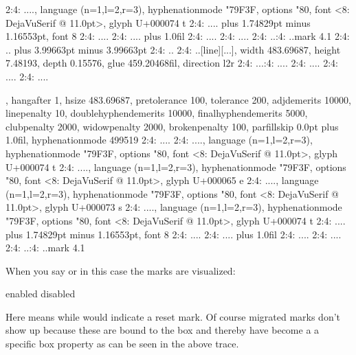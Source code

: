 2:4: ....\glyph[32768][...], language (n=1,l=2,r=3), hyphenationmode "79F3F, options "80, font <8: DejaVuSerif @ 11.0pt>, glyph U+000074 t
2:4: ....\glue[space][...] 3.49658pt plus 1.74829pt minus 1.16553pt, font 8
2:4: ....
2:4: ....\glue[parfill][...] 0.0pt plus 1.0fil
2:4: ....\glue[right][...] 0.0pt
2:4: ....
2:4: ..:4: ..{mark 4.1}
2:4: ..\glue[par][...] 11.98988pt plus 3.99663pt minus 3.99663pt
2:4: ..\glue[baseline][...] 8.34883pt
2:4: ..\hbox[line][...], width 483.69687, height 7.48193, depth 0.15576, glue 459.20468fil, direction l2r
2:4: ...:4: ....
2:4: ....\glue[left][...] 0.0pt
2:4: ....\glue[parfillleft][...] 0.0pt
2:4: ....\par[newgraf][...], hangafter 1, hsize 483.69687, pretolerance 100, tolerance 200, adjdemerits 10000, linepenalty 10, doublehyphendemerits 10000, finalhyphendemerits 5000, clubpenalty 2000, widowpenalty 2000, brokenpenalty 100, parfillskip 0.0pt plus 1.0fil, hyphenationmode 499519
2:4: ....\glue[indent][...] 0.0pt
2:4: ....\glyph[32768][...], language (n=1,l=2,r=3), hyphenationmode "79F3F, options "80, font <8: DejaVuSerif @ 11.0pt>, glyph U+000074 t
2:4: ....\glyph[32768][...], language (n=1,l=2,r=3), hyphenationmode "79F3F, options "80, font <8: DejaVuSerif @ 11.0pt>, glyph U+000065 e
2:4: ....\glyph[32768][...], language (n=1,l=2,r=3), hyphenationmode "79F3F, options "80, font <8: DejaVuSerif @ 11.0pt>, glyph U+000073 s
2:4: ....\glyph[32768][...], language (n=1,l=2,r=3), hyphenationmode "79F3F, options "80, font <8: DejaVuSerif @ 11.0pt>, glyph U+000074 t
2:4: ....\glue[space][...] 3.49658pt plus 1.74829pt minus 1.16553pt, font 8
2:4: ....
2:4: ....\glue[parfill][...] 0.0pt plus 1.0fil
2:4: ....\glue[right][...] 0.0pt
2:4: ....
2:4: ..:4: ..{mark 4.1}
\stoptyping
\stop

When you say \type {\showmakeup} or in this case \type {\showmakeup[mark]} the marks
are visualized:

\startlinecorrection
    \startcombination
        {} {enabled}
        {} {disabled}
    \stopcombination
\stoplinecorrection

Here  means  while  would indicate a \quote
{reset mark}. Of course migrated marks don't show up because these are bound to
the box and thereby have become a a specific box property as can be seen in the
above trace.


